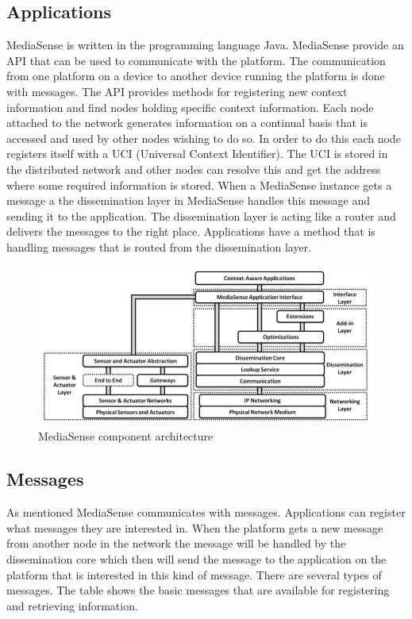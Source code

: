 \subsection{Applications}
MediaSense is written in the programming language Java. MediaSense provide an API that can be used to communicate with the platform. The communication from one platform on a device to another device running the platform is done with messages. The API provides methods for registering new context information and find nodes holding specific context information. Each node attached to the network generates information on a continual basis that is accessed and used by other nodes wishing to do so. In order to do this each node registers itself with a UCI (Universal Context Identifier). The UCI is stored in the distributed network and other nodes can resolve this and get the address where some required information is stored. When a MediaSense instance gets a message a the dissemination layer in MediaSense  handles this message and sending it to the application. The dissemination layer is acting like a router and delivers the messages to the right place. Applications have a method that is handling messages that is routed from the dissemination layer. 

\begin{figure}[H]
	\centering
    	\includegraphics[scale=0.50]{part_2/mediasense/ms_arch.png}
		\caption{MediaSense component architecture} 
\end{figure}

\subsection{Messages}
As mentioned MediaSense communicates with messages. Applications can register what messages they are interested in. When the platform gets a new message from another node in the network the message will be handled by the dissemination core which then will send the message to the application on the platform that is interested in this kind of message. There are several types of messages. The table shows the basic messages that are available for registering and retrieving information. 

